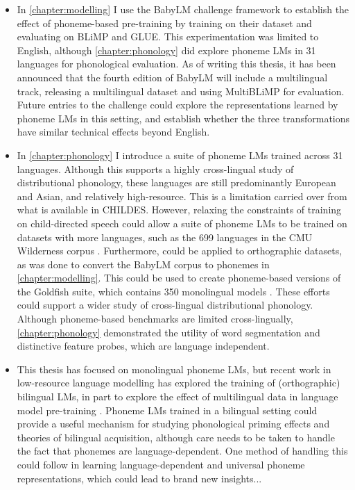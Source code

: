\begin{itemize}
    \item In \cref{chapter:modelling} I use the BabyLM challenge framework to establish the effect of phoneme-based pre-training by training on their dataset and evaluating on BLiMP and GLUE. This experimentation was limited to English, although \cref{chapter:phonology} did explore phoneme LMs in 31 languages for phonological evaluation. As of writing this thesis, it has been announced that the fourth edition of BabyLM will include a multilingual track, releasing a multilingual dataset and using MultiBLiMP for evaluation. Future entries to the challenge could explore the representations learned by phoneme LMs in this setting, and establish whether the three transformations have similar technical effects beyond English. 
    \item In \cref{chapter:phonology} I introduce a suite of phoneme LMs trained across 31 languages. Although this supports a highly cross-lingual study of distributional phonology, these languages are still predominantly European and Asian, and relatively high-resource. This is a limitation carried over from what is available in CHILDES. However, relaxing the constraints of training on child-directed speech could allow a suite of phoneme LMs to be trained on datasets with more languages, such as the 699 languages in the CMU Wilderness corpus \citep{8683536}. Furthermore, \gpp could be applied to orthographic datasets, as was done to convert the BabyLM corpus to phonemes in \cref{chapter:modelling}. This could be used to create phoneme-based versions of the Goldfish suite, which contains 350 monolingual models \citep{chang2024goldfish}. These efforts could support a wider study of cross-lingual distributional phonology. Although phoneme-based benchmarks are limited cross-lingually, \cref{chapter:phonology} demonstrated the utility of word segmentation and distinctive feature probes, which are language independent.
    \item This thesis has focused on monolingual phoneme LMs, but recent work in low-resource language modelling has explored the training of (orthographic) bilingual LMs, in part to explore the effect of multilingual data in language model pre-training \citep{arnett2025acquisition}. Phoneme LMs trained in a bilingual setting could provide a useful mechanism for studying phonological priming effects and theories of bilingual acquisition, although care needs to be taken to handle the fact that phonemes are language-dependent. One method of handling this could follow \citet{li2020universal} in learning language-dependent and universal phoneme representations, which could lead to brand new insights...

\end{itemize}
